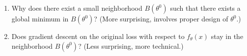 \begin{enumerate}
    \item Why does there exist a small neighborhood $B(\theta^0)$ such that there exists a global minimum in $B(\theta^0)$? (More surprising, involves proper design of $\theta^0$.)
    \item Does gradient descent on the original loss with respect to $f_\theta(x)$ stay in the neighborhood $B(\theta^0)$? (Less surprising, more technical.)
\end{enumerate}